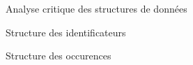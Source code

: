 \documentclass{article}
\begin{document}
\begin{section}{Analyse critique des structures de données}

  \begin{subsection}{Structure des identificateurs}
  \end{subsection}

  \begin{subsection}{Structure des occurences}
  \end{subsection}

\end{section}
\end{document}
